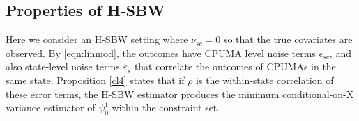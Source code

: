 

\subsection{Properties of H-SBW}\label{app:AsecII}




Here we consider an H-SBW setting where $\nu_{sc}=0$ so that the true covariates are observed. By \eqref{eqn:linmod}, the outcomes have CPUMA level noise terms  $\epsilon_{sc}$, and also state-level noise terms $\varepsilon_s$ that correlate the outcomes of CPUMAs in the same state. Proposition \ref{cl4} states that if $\rho$ is the within-state correlation of these error terms, the H-SBW estimator produces the minimum conditional-on-X variance estimator of $\psi_0^1$ within the constraint set.

